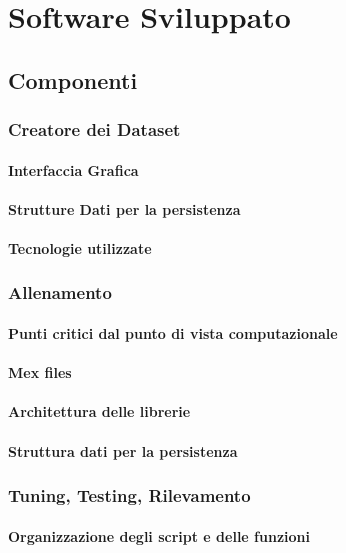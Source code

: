 
\chapter{Software Sviluppato}
\label{chap:software}
    \section{Componenti}
        \subsection{Creatore dei Dataset}
            \subsubsection{Interfaccia Grafica}
            \subsubsection{Strutture Dati per la persistenza}
            \subsubsection{Tecnologie utilizzate}
        \subsection{Allenamento}
            \subsubsection{Punti critici dal punto di vista computazionale}
            \subsubsection{Mex files}
            \subsubsection{Architettura delle librerie}
            \subsubsection{Struttura dati per la persistenza}
        \subsection{Tuning, Testing, Rilevamento}
            \subsubsection{Organizzazione degli script e delle funzioni}
